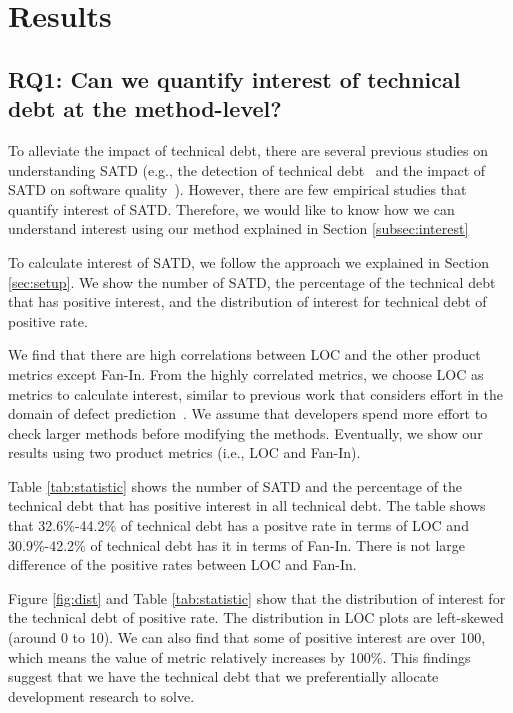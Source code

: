 \section{Results} \label{sec:results}
\subsection{RQ1: Can we quantify interest of technical debt at the method-level?}
To alleviate the impact of technical debt, there are several previous studies on understanding SATD (e.g., the detection of technical debt~\cite{Potdar2014ICSME,Zazworka2013EASE} and the impact of SATD on software quality~\cite{Wehaibi2016SANER}).
However, there are few empirical studies that quantify interest of SATD.
Therefore, we would like to know how we can understand interest using our method explained in Section \ref{subsec:interest}

To calculate interest of SATD, we follow the approach we explained in Section \ref{sec:setup}.
We show the number of SATD, the percentage of the technical debt that has positive interest, and the distribution of interest for technical debt of positive rate.

We find that there are high correlations between LOC and the other product metrics except Fan-In. 
From the highly correlated metrics, we choose LOC as metrics to calculate interest, similar to previous work that considers effort in the domain of defect prediction~\cite{Kamei2010ICSM,Kamei2013TSE}. We assume that developers spend more effort to check larger methods before modifying the methods. Eventually, we show our results using two product metrics (i.e., LOC and Fan-In).

Table \ref{tab:statistic} shows the number of SATD and the percentage of the technical debt that has positive interest in all technical debt. The table shows that 32.6\%-44.2\% of technical debt has a positve rate in terms of LOC and 30.9\%-42.2\% of technical debt has it in terms of Fan-In. 
There is not large difference of the positive rates between LOC and Fan-In. 

Figure \ref{fig:dist} and Table \ref{tab:statistic} show that the distribution of interest for the technical debt of positive rate. The distribution in LOC plots are left-skewed (around 0 to 10). We can also find that some of positive interest are over 100, which means the value of metric relatively increases by 100\%.
This findings suggest that we have the technical debt that we preferentially allocate development research to solve.


